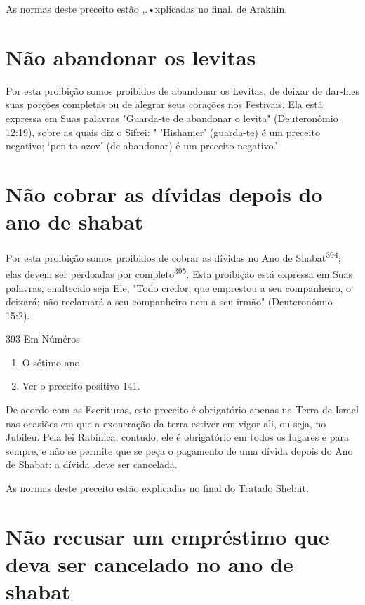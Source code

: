 \begin{itemize}
\begin{enumrate}
\begin{itemize}
\begin{itemize}
\begin{itemize}
As normas deste preceito estão ,.•xplicadas no final. de Arakhin.

\section{Não abandonar os levitas}

Por esta proibição somos proibidos de abandonar os Levitas, de dei­xar
de dar-lhes suas porções completas ou de alegrar seus corações nos
Festi­vais. Ela está expressa em Suas palavras "Guarda-te de abandonar o
levita" (Deu­teronômio 12:19), sobre as quais diz o Sifrei: " 'Hishamer'
(guarda-te) é um pre­ceito negativo; `pen ta azov' (de abandonar) é um
preceito negativo.'

\section{Não cobrar as dívidas depois do ano de shabat}

Por esta proibição somos proibidos de cobrar as dívidas no Ano de
Shabat\textsuperscript{394}; elas devem ser perdoadas por
completo\textsuperscript{395}. Esta proibição está ex­pressa em Suas
palavras, enaltecido seja Ele, "Todo credor, que emprestou a seu
companheiro, o deixará; não reclamará a seu companheiro nem a seu
ir­mão" (Deuteronômio 15:2).

393 Em Núméros


\begin{enumerate}
\def\labelenumi{\arabic{enumi}.}
\setcounter{enumi}{393}
\item
 
 O sétimo ano
 
\item
 
 Ver o preceito positivo 141.
 
\end{enumerate}


De acordo com as Escrituras, este preceito é obrigatório apenas na Terra
de Israel nas ocasiões em que a exoneração da terra estiver em vigor
ali, ou seja, no Jubileu. Pela lei Rabínica, contudo, ele é obrigatório
em todos os lugares e para sempre, e não se permite que se peça o
pagamento de uma dívi­da depois do Ano de Shabat: a dívida .deve ser
cancelada.


As normas deste preceito estão explicadas no final do Tratado Shebiit.


\section{Não recusar um empréstimo que deva ser cancelado no ano de shabat}


\end{itemize}
\end{itemize}
\end{itemize}
\end{enumrate}
\end{itemize}
